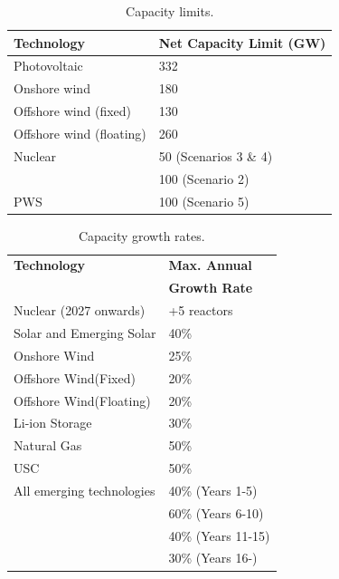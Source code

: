 


\begin{table}[!ht]
	\caption{Capacity limits.}
	\vspace{0.1in}
	\begin{tabularx}{\textwidth}{p{} p{} }
		\hline
\textbf{Technology} & \textbf{Net Capacity} \textbf{Limit} (GW)\\
\hline
Photovoltaic \cite{isep_53_2018} & 332 \\
Onshore wind \cite{heger_wind_2016,kato_energy_2016} & 180 \\
Offshore wind (fixed) \cite{heger_wind_2016,kato_energy_2016}& 130 \\
Offshore wind (floating) \cite{heger_wind_2016,kato_energy_2016}& 260 \\
Nuclear & 50 (Scenarios 3 \& 4) \\
 & 100 (Scenario 2) \\
\gls{PWS} \cite{pinaud_technical_2013} & 100 (Scenario 5) \\
\hline 
\end{tabularx}
\label{caplim}
\end{table}

\begin{table}[!ht]
	\caption{Capacity growth rates.}
	\vspace{0.1in}
	\begin{tabularx}{\textwidth}{p{} p{}}
		\hline
\textbf{Technology} & \textbf{Max. Annual} \\
  & \textbf{Growth Rate}   \\
\hline
Nuclear (2027 onwards) & +5 reactors \\
Solar and Emerging Solar \cite{irena_renewable_2020} & 40\%  \\
Onshore Wind \cite{irena_renewable_2020} & 25\% \\
Offshore Wind(Fixed) \cite{irena_renewable_2020} & 20\% \\
Offshore Wind(Floating) \cite{irena_renewable_2020} & 20\% \\
Li-ion Storage & 30\% \\
Natural Gas &  50\% \\
\gls{USC} & 50\% \\
All emerging technologies & 40\% (Years 1-5) \\
& 60\% (Years 6-10) \\
 & 40\% (Years 11-15) \\
 & 30\% (Years 16-) \\
\hline 
\end{tabularx}
\label{growrate}
\end{table}

